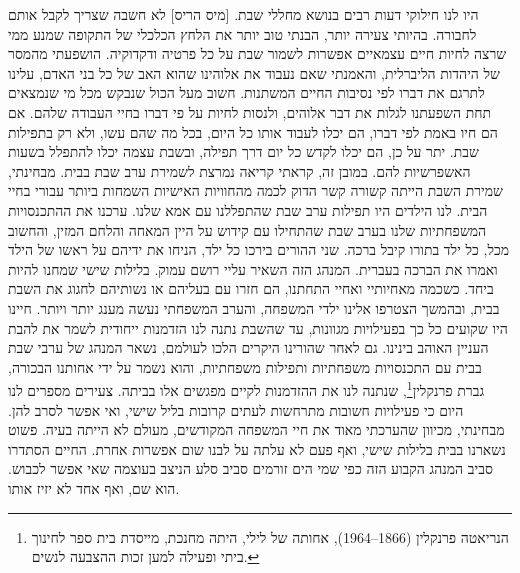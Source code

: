 \documentclass[14pt, article, extrafontsizes, twopage, a4paper]{memoir}
\begin{document}
היו לנו חילוקי דעות רבים בנושא מחללי שבת. [מיס הריס] לא חשבה שצריך לקבל אותם לחבורה. בהיותי צעירה יותר, הבנתי טוב יותר את הלחץ הכלכלי של התקופה שמנע ממי שרצה לחיות חיים עצמאיים אפשרות לשמור שבת על כל פרטיה ודקדוקיה. הושפעתי מהמסר של היהדות הליברלית, והאמנתי שאם נעבוד את אלוהינו שהוא האב של כל בני האדם, עלינו לתרגם את דברו לפי נסיבות החיים המשתנות. חשוב מעל הכול שנבקש מכל מי שנמצאים תחת השפעתנו לגלות את דבר אלוהים, ולנסות לחיות על פי דברו בחיי העבודה שלהם. אם הם חיו באמת לפי דברו, הם יכלו לעבוד אותו כל היום, בכל מה שהם עשו, ולא רק בתפילות שבת. יתר על כן, הם יכלו לקדש כל יום דרך תפילה, ובשבת עצמה יכלו להתפלל בשעות האשפרשיות להם. במובן זה, קראתי קריאה נמרצת לשמירת ערב שבת בבית. מבחינתי, שמירת השבת הייתה קשורה קשר הדוק לכמה מהחוויות האישיות השמחות ביותר עבורי בחיי הבית. לנו הילדים היו תפילות ערב שבת שהתפללנו עם אמא שלנו. ערכנו את ההתכנסויות המשפחתיות שלנו בערב שבת שהתחילו עם קידוש על היין המאחה והלחם המזין, והחשוב מכל, כל ילד בתורו קיבל ברכה. שני ההורים בירכו כל ילד, הניחו את ידיהם על ראשו של הילד ואמרו את הברכה בעברית. המנהג הזה השאיר עליי רושם עמוק. בלילות שישי שמחנו להיות ביחד. כשכמה מאחיותיי ואחיי התחתנו, הם חזרו עם בעליהם או נשותיהם לחגוג את השבת בבית, ובהמשך הצטרפו אלינו ילדי המשפחה, והערב המשפחתי נעשה מענג יותר ויותר. חיינו היו שקועים כל כך בפעילויות מגוונות, עד שהשבת נתנה לנו הזדמנות ייחודית לשמר את להבת העניין האוהב בינינו. גם לאחר שהורינו היקרים הלכו לעולמם, נשאר המנהג של ערבי שבת בבית עם התכנסויות משפחתיות ותפילות משפחתיות, והוא נשמר על ידי אחותנו הבכורה, גברת פרנקלין\footnote{הנריאטה פרנקלין (1866–1964), אחותה של לילי, היתה מחנכת, מייסדת בית ספר לחינוך ביתי ופעילה למען זכות ההצבעה לנשים.}, שנתנה לנו את ההזדמנות לקיים מפגשים אלו בביתה. צעירים מספרים לנו היום כי פעילויות חשובות מתרחשות לעתים קרובות בליל שישי, ואי אפשר לסרב להן. מבחינתי, מכיוון שהערכתי מאוד את חיי המשפחה המקודשים, מעולם לא הייתה בעיה. פשוט נשארנו בבית בלילות שישי, ואף פעם לא עלתה על לבנו שום אפשרות אחרת. החיים הסתדרו סביב המנהג הקבוע הזה כפי שמי הים זורמים סביב סלע הניצב בעוצמה שאי אפשר לכבוש. הוא שם, ואף אחד לא יזיז אותו.
\end{document}
